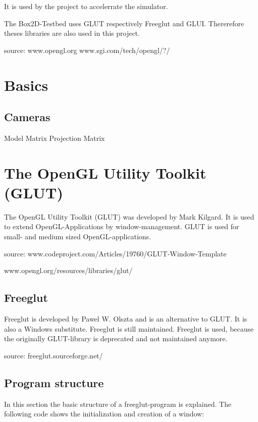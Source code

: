 \documentclass[10pt,a4paper,DIV=11]{scrreprt}
\begin{document}
It is used by the project to accelerrate the simulator.

The Box2D-Testbed uses GLUT respectively Freeglut and GLUI. Thererefore theses libraries are also used in this project.

source: www.opengl.org
www.sgi.com/tech/opengl/?/

\section{Basics}

\subsection{Cameras}

Model Matrix
Projection Matrix

\section{The OpenGL Utility Toolkit (GLUT)}
The OpenGL Utility Toolkit (GLUT) was developed by Mark Kilgard. It is used to extend OpenGL-Applications by window-management. GLUT is used for small- and medium sized OpenGL-applications.

source: www.codeproject.com/Articles/19760/GLUT-Window-Template

www.opengl.org/resources/libraries/glut/

\subsection{Freeglut}
Freeglut is developed by Pawel W. Olszta and is an alternative to GLUT. It is also a Windows substitute. Freeglut is still maintained. Freeglut is used, because the originally GLUT-library is deprecated and not maintained anymore.

source: freeglut.sourceforge.net/

\subsection{Program structure}
In this section the basic structure of a freeglut-program is explained.
The following code shows the initialization and creation of a window:
\end{document}
